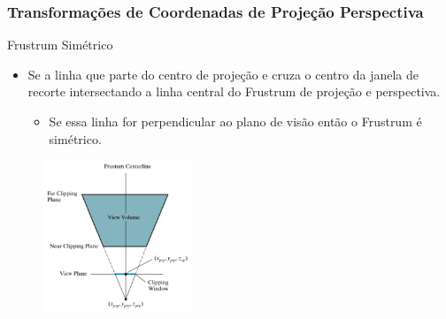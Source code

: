 \documentclass{beamer}
\begin{document}
\begin{frame}
\frametitle{Transformações de Coordenadas de Projeção Perspectiva}
	\begin{block}{Frustrum Simétrico}
		\begin{itemize}
			\item Se a linha que parte do centro de projeção  e cruza o centro da janela de recorte intersectando a linha central do Frustrum de projeção e perspectiva.
			\begin{itemize}
				\item Se essa linha for perpendicular ao plano de visão então o Frustrum é simétrico.
			\end{itemize}
		\end{itemize}	
	\end{block}
	
		\begin{figure}[!h]
			\begin{center}
			\includegraphics[width=0.4\textwidth]{Figures/FruCim}
			\end{center}
	\end{figure}
\end{frame}
\end{document}
